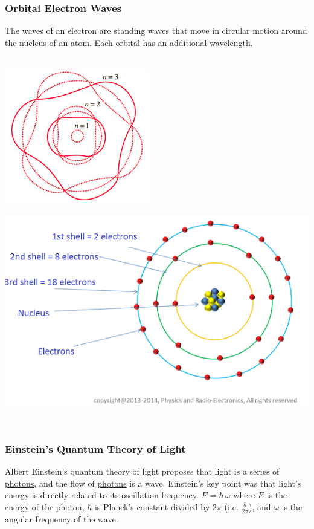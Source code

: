 \documentclass{article}
\begin{document}
\subsubsection{Orbital Electron Waves}
The waves of an electron are standing waves that move in circular motion around the nucleus of an atom. Each orbital has an additional wavelength.\\\\
\begin{minipage}{0.45\textwidth}
    \includegraphics[scale=0.5]{images/electron_waves.png}
\end{minipage}
\begin{minipage}{0.45\textwidth}\label{sec:electronwaves}
    \includegraphics[scale=0.33]{images/atom_orbitals.png}
\end{minipage}\leavevmode\\

\subsubsection{Einstein's Quantum Theory of Light}
Albert Einstein's quantum theory of light proposes that light is a series of \hyperref[sec:photons]{photons}, and the flow of \hyperref[sec:photons]{photons} is a wave. Einstein's key point was that light's energy is directly related to its \hyperref[sec:oscillation]{oscillation} frequency. $E = \hbar\,\omega$ where $E$ is the energy of the \hyperref[sec:photons]{photon}, $\hbar$ is Planck's constant divided by $2\pi$ (i.e. $\frac{h}{2\pi}$), and $\omega$ is the angular frequency of the wave.
\end{document}
